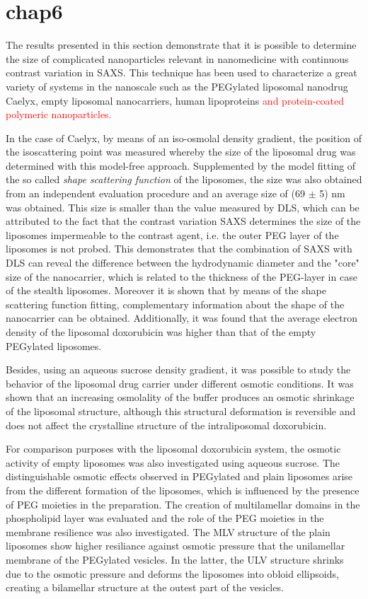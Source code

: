 \section{chap6}

The results presented in this section demonstrate that it is possible to determine the size of complicated nanoparticles relevant in nanomedicine with continuous contrast variation in SAXS. This technique has been used to characterize a great variety of systems in the nanoscale such as the PEGylated liposomal nanodrug Caelyx\textregistered, empty liposomal nanocarriers, human lipoproteins \textcolor{red}{and protein-coated polymeric nanoparticles.}

In the case of Caelyx\textregistered, by means of an iso-osmolal density gradient, the position of the isoscattering point was measured whereby the size of the liposomal drug was determined with this model-free approach. Supplemented by the model fitting of the so called \emph{shape scattering function} of the liposomes, the size was also obtained from an independent evaluation procedure and an average size of (69 $\pm$ 5) nm was obtained. This size is smaller than the value measured by DLS, which can be attributed to the fact that the contrast variation SAXS determines the size of the liposomes impermeable to the contrast agent, i.e. the outer PEG layer of the liposomes is not probed. This demonstrates that the combination of SAXS with DLS can reveal the difference between the hydrodynamic diameter and the "core" size of the nanocarrier, which is related to the thickness of the PEG-layer in case of the stealth liposomes. Moreover it is shown that by means of the shape scattering function fitting, complementary information about the shape of the nanocarrier can be obtained. Additionally, it was found that the average electron density of the liposomal doxorubicin was higher than that of the empty PEGylated liposomes.

Besides, using an aqueous sucrose density gradient, it was possible to study the behavior of the liposomal drug carrier under different osmotic conditions. It was shown that an increasing osmolality of the buffer produces an osmotic shrinkage of the liposomal structure, although this structural deformation is reversible and does not affect the crystalline structure of the intraliposomal doxorubicin.

For comparison purposes with the liposomal doxorubicin system, the osmotic activity of empty liposomes was also investigated using aqueous sucrose. The distinguishable osmotic effects observed in PEGylated and plain liposomes arise from the different formation of the liposomes, which is influenced by the presence of PEG moieties in the preparation. The creation of multilamellar domains in the phospholipid layer was evaluated and the role of the PEG moieties in the membrane resilience was also investigated. The MLV structure of the plain liposomes show higher resiliance against osmotic pressure that the unilamellar membrane of the PEGylated vesicles. In the latter, the ULV structure shrinks due to the osmotic pressure and deforms the liposomes into obloid ellipsoids, creating a bilamellar structure at the outest part of the vesicles.

